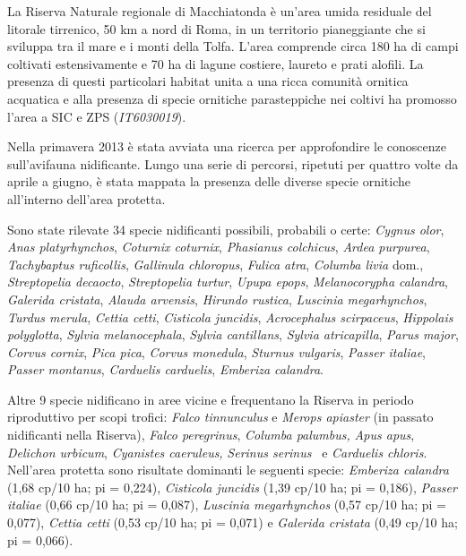 \vspace{1cm}
La Riserva Naturale regionale di Macchiatonda è un{\textquoteright}area umida residuale del litorale tirrenico, 50 km a nord di Roma, in
un territorio pianeggiante che si sviluppa tra il mare e i monti della Tolfa. L'area comprende circa 180 ha di campi
coltivati estensivamente e 70 ha di lagune costiere, laureto e prati alofili. La presenza di questi particolari habitat
unita a una ricca comunità ornitica acquatica e alla presenza di specie ornitiche parasteppiche nei coltivi ha promosso l{\textquoteright}area a SIC e ZPS (\textit{IT6030019}).

Nella primavera 2013 è stata avviata una ricerca per approfondire le conoscenze sull{\textquoteright}avifauna nidificante. Lungo una serie di percorsi, ripetuti per quattro volte da aprile a giugno, è stata mappata la presenza delle diverse specie ornitiche all{\textquoteright}interno dell{\textquoteright}area protetta.

Sono state rilevate 34 specie nidificanti possibili, probabili o certe: \textit{Cygnus olor}, \textit{Anas
platyrhynchos}, \textit{Coturnix coturnix},\textit{ Phasianus colchicus}, \textit{Ardea purpurea},\textit{ Tachybaptus
ruficollis}, \textit{Gallinula chloropus}, \textit{Fulica atra}, \textit{Columba livia} dom., \textit{Streptopelia
decaocto}, \textit{Streptopelia turtur}, \textit{Upupa epops}, \textit{Melanocorypha calandra}, \textit{Galerida
cristata}, \textit{Alauda arvensis}, \textit{Hirundo rustica}, \textit{Luscinia megarhynchos}, \textit{Turdus merula},
\textit{Cettia cetti}, \textit{Cisticola juncidis}, \textit{Acrocephalus scirpaceus}, \textit{Hippolais polyglotta},
\textit{Sylvia melanocephala}, \textit{Sylvia cantillans}, \textit{Sylvia atricapilla}, \textit{Parus major},
\textit{Corvus cornix}, \textit{Pica pica}, \textit{Corvus monedula}, \textit{Sturnus vulgaris}, \textit{Passer
italiae}, \textit{Passer montanus}, \textit{Carduelis carduelis}, \textit{Emberiza calandra}. 

Altre 9 specie nidificano in aree vicine e frequentano la Riserva in periodo riproduttivo per scopi trofici:
\textit{Falco tinnunculus} e \textit{Merops apiaster} (in passato nidificanti nella Riserva), \textit{Falco
peregrinus}, \textit{Columba palumbus,} \textit{Apus apus}, \textit{Delichon urbicum}, \textit{Cyanistes caeruleus,}
\textit{Serinus serinus} \ e \textit{Carduelis chloris}. Nell{\textquoteright}area protetta sono risultate dominanti le seguenti
specie: \textit{Emberiza calandra} (1,68 cp/10 ha; pi = 0,224), \textit{Cisticola juncidis} (1,39 cp/10 ha; pi =
0,186), \textit{Passer italiae} (0,66 cp/10 ha; pi = 0,087), \textit{Luscinia megarhynchos} (0,57 cp/10 ha; pi =
0,077), \textit{Cettia cetti} (0,53 cp/10 ha; pi = 0,071) e \textit{Galerida cristata} (0,49 cp/10 ha; pi = 0,066).

